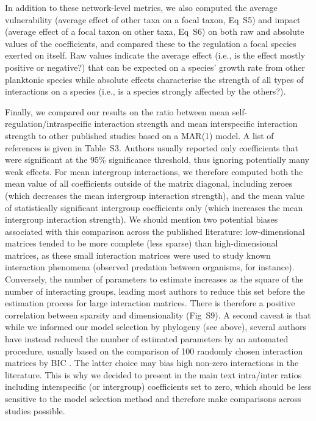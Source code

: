\documentclass[10pt]{article}
\begin{document}
In addition to these network-level metrics, we also computed the average
vulnerability (average effect of other taxa on a focal taxon, Eq~S5) and impact (average effect of a focal taxon on other taxa,
Eq~S6) on both raw and absolute values of the coefficients,
and compared these to the regulation a focal species exerted on itself.
Raw values indicate the average effect (i.e., is the effect mostly
positive or negative?) that can be expected on a species' growth rate
from other planktonic species while absolute effects characterise
the strength of all types of interactions on a species (i.e., is a
species strongly affected by the others?).

Finally, we compared our results on the ratio between mean self-regulation/intraspecific
interaction strength and mean interspecific interaction strength to
other published studies based on a MAR(1) model. A list of references
is given in Table~S3. Authors usually reported only
coefficients that were significant at the 95\% significance threshold,
thus ignoring potentially many weak effects. For mean intergroup interactions,
we therefore computed both the mean value of all coefficients outside
of the matrix diagonal, including zeroes (which decreases the mean intergroup interaction strength), and the
mean value of statistically significant intergroup coefficients only
(which increases the mean intergroup interaction
strength). We should mention two potential biases associated with
this comparison across the published literature: low-dimensional matrices
tended to be more complete (less sparse) than high-dimensional matrices,
as these small interaction matrices were used to study known interaction
phenomena (observed predation between organisms, for instance). Conversely,
the number of parameters to estimate increases as the square of the
number of interacting groups, leading most authors to reduce this
set before the estimation process for large interaction matrices.
There is therefore a positive correlation between sparsity and dimensionality
(Fig~S9). A second caveat is that while we informed
our model selection by phylogeny (see above), several authors have instead
reduced the number of estimated parameters by an automated procedure,
usually based on the comparison of 100 randomly chosen interaction
matrices by BIC \citep{ives_estimating_2003}. The latter choice
may bias high non-zero interactions in the literature. This is why
we decided to present in the main text intra/inter ratios including
interspecific (or intergroup) coefficients set to zero, which should
be less sensitive to the model selection method and therefore make
comparisons across studies possible.
\end{document}
